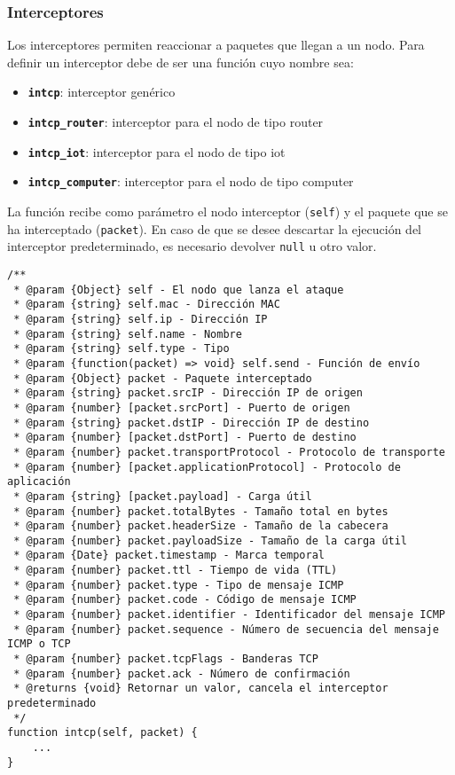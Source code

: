 \subsubsection{Interceptores}
\label{subsubsec:BibliotecaExternaInterceptores}
Los interceptores permiten reaccionar a paquetes que llegan a un nodo. Para definir un interceptor debe de ser una función cuyo nombre sea:
\begin{itemize}
    \item \textbf{\texttt{intcp}}: interceptor genérico
    \item \textbf{\texttt{intcp\_router}}: interceptor para el nodo de tipo router
    \item \textbf{\texttt{intcp\_iot}}: interceptor para el nodo de tipo iot
    \item \textbf{\texttt{intcp\_computer}}: interceptor para el nodo de tipo computer
\end{itemize}
La función recibe como parámetro el nodo interceptor (\texttt{self}) y el paquete que se ha interceptado (\texttt{packet}). En caso de que se desee descartar la ejecución del interceptor predeterminado, es necesario devolver \texttt{null} u otro valor.
\begin{verbatim}
/**
 * @param {Object} self - El nodo que lanza el ataque
 * @param {string} self.mac - Dirección MAC
 * @param {string} self.ip - Dirección IP
 * @param {string} self.name - Nombre
 * @param {string} self.type - Tipo
 * @param {function(packet) => void} self.send - Función de envío
 * @param {Object} packet - Paquete interceptado
 * @param {string} packet.srcIP - Dirección IP de origen
 * @param {number} [packet.srcPort] - Puerto de origen
 * @param {string} packet.dstIP - Dirección IP de destino
 * @param {number} [packet.dstPort] - Puerto de destino
 * @param {number} packet.transportProtocol - Protocolo de transporte
 * @param {number} [packet.applicationProtocol] - Protocolo de aplicación
 * @param {string} [packet.payload] - Carga útil
 * @param {number} packet.totalBytes - Tamaño total en bytes
 * @param {number} packet.headerSize - Tamaño de la cabecera
 * @param {number} packet.payloadSize - Tamaño de la carga útil
 * @param {Date} packet.timestamp - Marca temporal
 * @param {number} packet.ttl - Tiempo de vida (TTL)
 * @param {number} packet.type - Tipo de mensaje ICMP
 * @param {number} packet.code - Código de mensaje ICMP
 * @param {number} packet.identifier - Identificador del mensaje ICMP
 * @param {number} packet.sequence - Número de secuencia del mensaje ICMP o TCP
 * @param {number} packet.tcpFlags - Banderas TCP
 * @param {number} packet.ack - Número de confirmación
 * @returns {void} Retornar un valor, cancela el interceptor predeterminado
 */
function intcp(self, packet) {
    ...
}
\end{verbatim}

